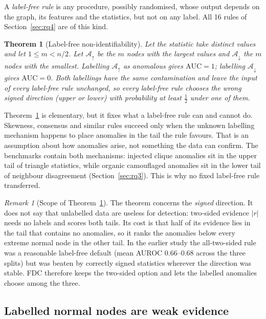 \documentclass[pdflatex,sn-mathphys-ay]{sn-jnl}
\theoremstyle{plain}
\newtheorem{theorem}{Theorem}
\theoremstyle{remark}
\newtheorem{remark}{Remark}
\begin{document}
A \emph{label-free rule} is any procedure, possibly randomised, whose output depends on the graph, its features and the statistics, but not on any label. All 16 rules of Section~\ref{sec:rq4} are of this kind.

\begin{theorem}[Label-free non-identifiability]\label{thm:nonid}
Let the statistic take distinct values and let $1 \le m < n/2$. Let $\mathcal{A}_{\uparrow}$ be the $m$ nodes with the largest values and $\mathcal{A}_{\downarrow}$ the $m$ nodes with the smallest. Labelling $\mathcal{A}_{\uparrow}$ as anomalous gives $\mathrm{AUC} = 1$; labelling $\mathcal{A}_{\downarrow}$ gives $\mathrm{AUC} = 0$. Both labellings have the same contamination and leave the input of every label-free rule unchanged, so every label-free rule chooses the wrong signed direction (upper or lower) with probability at least $\tfrac12$ under one of them.
\end{theorem}

Theorem~\ref{thm:nonid} is elementary, but it fixes what a label-free rule can and cannot do. Skewness, consensus and similar rules succeed only when the unknown labelling mechanism happens to place anomalies in the tail the rule favours. That is an assumption about how anomalies arise, not something the data can confirm. The benchmarks contain both mechanisms: injected clique anomalies sit in the upper tail of triangle statistics, while organic camouflaged anomalies sit in the lower tail of neighbour disagreement (Section~\ref{sec:rq3}). This is why no fixed label-free rule transferred.

\begin{remark}[Scope of Theorem~\ref{thm:nonid}]\label{rem:scope}
The theorem concerns the \emph{signed} direction. It does not say that unlabelled data are useless for detection: two-sided evidence $|r|$ needs no labels and scores both tails. Its cost is that half of its evidence lies in the tail that contains no anomalies, so it ranks the anomalies below every extreme normal node in the other tail. In the earlier study the all-two-sided rule was a reasonable label-free default (mean AUROC 0.66--0.68 across the three splits) but was beaten by correctly signed statistics wherever the direction was stable. FDC therefore keeps the two-sided option and lets the labelled anomalies choose among the three.
\end{remark}

\subsection{Labelled normal nodes are weak evidence}
\end{document}
